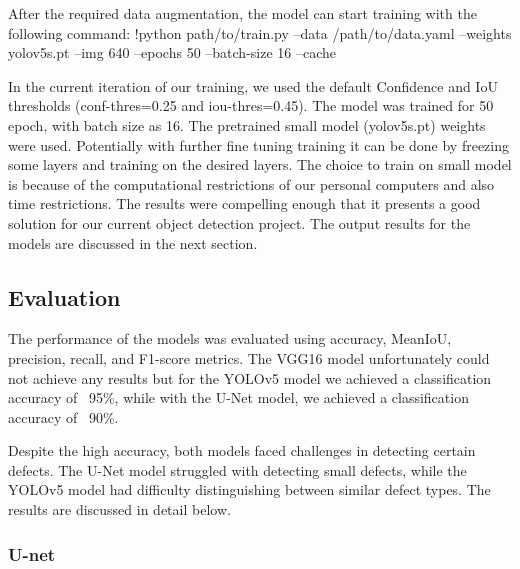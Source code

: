 \documentclass[12pt]{article}
\begin{document}
After the required data augmentation, the model can start training with the following command:
!python path/to/train.py --data /path/to/data.yaml --weights yolov5s.pt --img 640 --epochs 50 --batch-size 16 --cache

In the current iteration of our training, we used the default Confidence and IoU thresholds (conf-thres=0.25 and iou-thres=0.45). The model was trained for 50 epoch, with batch size as 16. The pretrained small model (yolov5s.pt) weights were used. Potentially with further fine tuning training it can be done by freezing some layers and training on the desired layers. The choice to train on small model is because of the computational restrictions of our personal computers and also time restrictions. The results were compelling enough that it presents a good solution for our current object detection project. The output results for the models are discussed in the next section.

\clearpage
\newpage

\subsection{Evaluation}

The performance of the models was evaluated using accuracy, MeanIoU, precision, recall, and F1-score metrics. The VGG16 model unfortunately could not achieve any results but for the YOLOv5 model we achieved a classification accuracy of ~95\%, while with the U-Net model, we achieved a classification accuracy of ~90\%. 

Despite the high accuracy, both models faced challenges in detecting certain defects. The U-Net model struggled with detecting small defects, while the YOLOv5 model had difficulty distinguishing between similar defect types. The results are discussed in detail below.

\subsubsection{U-net}
\end{document}
